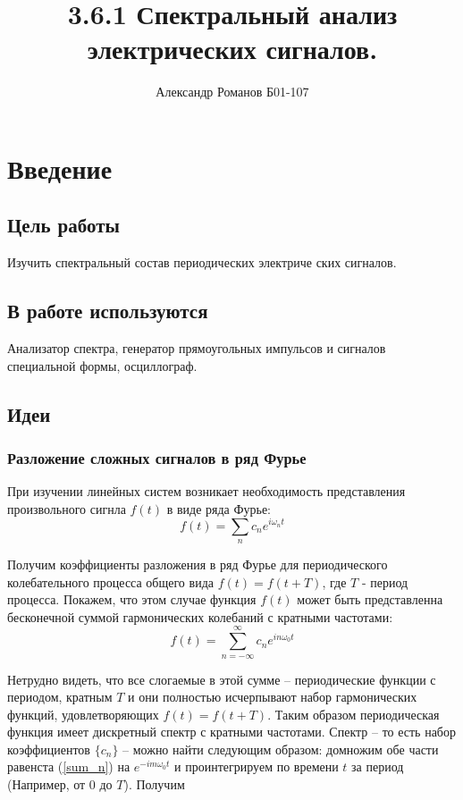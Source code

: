 \documentclass{article}
\author{Александр Романов Б01-107}
\date{}
\title{3.6.1 Спектральный анализ электрических сигналов.}
\begin{document}
\maketitle
\section{Введение}
\subsection{Цель работы}
Изучить спектральный состав периодических электриче­
ских сигналов.
\subsection{В работе используются} 
Анализатор спектра, генератор прямоугольных импульсов и сигналов специальной формы,
осциллограф.

\subsection{Идеи}
\subsubsection{Разложение сложных сигналов в ряд Фурье}

При изучении линейных систем возникает необходимость представления произвольного
сигнла \(f(t)\) в виде ряда Фурье:
\[ f(t) = \sum_n c_ne^{i\omega_nt} \] 

Получим коэффициенты разложения в ряд Фурье для периодического колебательного процесса
общего вида \( f(t) = f(t + T) \), где \( T \) - период процесса. Покажем, что этом случае функция 
\( f(t) \) может быть представленна бесконечной суммой гармонических колебаний с кратными частотами:
\begin{equation} 
    f(t) = \sum_{n=-\infty}^{\infty} c_ne^{in\omega_0t}
    \label{sum_n}
\end{equation}

Нетрудно видеть, что все слогаемые в этой сумме -- периодические функции с периодом, кратным \(T\) и они
полностью исчерпывают набор гармонических функций, удовлетворяющих \( f(t) = f(t + T) \). Таким образом 
периодическая функция имеет дискретный спектр с кратными частотами.
Спектр -- то есть набор коэффициентов \(\{c_n\}\) -- можно найти следующим образом: домножим обе части
равенста (\ref{sum_n}) на \( e^{-im\omega_0t} \) и проинтегрируем по времени \(t\) за период (Например, от 0
до \(T\)). Получим
\end{document}
